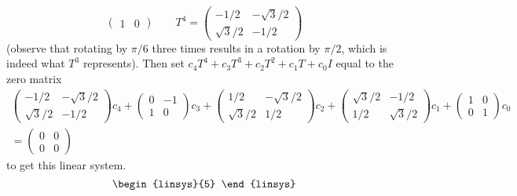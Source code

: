 \begin{exercises}
\begin{answer}
\begin{exparts}
\begin{equation*}
\begin{pmatrix}
                 1           &0
              \end{pmatrix}
             \qquad
              T^4=
              \begin{pmatrix}
                 -1/2        &-\sqrt{3}/2  \\
                 \sqrt{3}/2  &-1/2
              \end{pmatrix}
           \end{equation*}
           (observe that rotating by $\pi/6$ three times results in a 
           rotation by $\pi/2$, which is indeed what $T^3$ represents).
           Then set \( c_4T^4+c_3T^3+c_2T^2+c_1T+c_0I \) 
           equal to the zero matrix 
           \begin{multline*}
             \begin{pmatrix}
                 -1/2        &-\sqrt{3}/2  \\
                 \sqrt{3}/2  &-1/2
              \end{pmatrix}c_4
              +\begin{pmatrix}
                 0           &-1           \\
                 1           &0
              \end{pmatrix}c_3
              +\begin{pmatrix}
                 1/2         &-\sqrt{3}/2  \\
                 \sqrt{3}/2  &1/2
              \end{pmatrix}c_2
              +\begin{pmatrix}
                 \sqrt{3}/2  &-1/2       \\
                 1/2         &\sqrt{3}/2
               \end{pmatrix}c_1
              +\begin{pmatrix}
                 1  &0  \\
                 0  &1 
               \end{pmatrix}c_0                          \\
               =\begin{pmatrix}
                  0  &0  \\
                  0  &0 
               \end{pmatrix}                     
           \end{multline*}
           to get this linear system.
           \begin{equation*}
             \begin{linsys}{5}

\end{linsys}
\end{equation*}
\end{exparts}
\end{answer}
\end{exercises}
